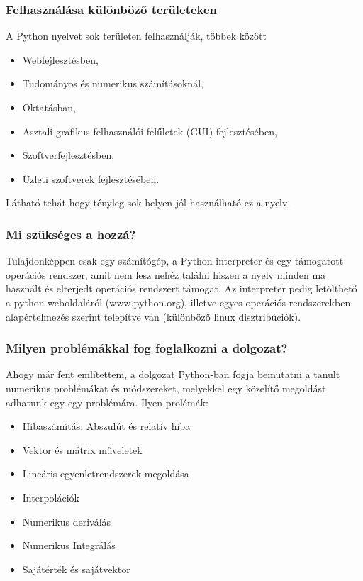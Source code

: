     \subsubsection{Felhasználása különböző
területeken}\label{felhasznuxe1luxe1sa-kuxfcluxf6nbuxf6zux151-teruxfcleteken}

    A Python nyelvet sok területen felhasználják, többek között

\begin{itemize}
\item
  Webfejlesztésben,
\item
  Tudományos és numerikus számításoknál,
\item
  Oktatásban,
\item
  Asztali grafikus felhasználói felűletek (GUI) fejlesztésében,
\item
  Szoftverfejlesztésben,
\item
  Üzleti szoftverek fejlesztésében.
\end{itemize}

Látható tehát hogy tényleg sok helyen jól használható ez a nyelv.

    \subsubsection{Mi szükséges a
hozzá?}\label{mi-szuxfcksuxe9ges-a-hozzuxe1}

    Tulajdonképpen csak egy számítógép, a Python interpreter és egy
támogatott operációs rendszer, amit nem lesz nehéz találni hiszen a
nyelv minden ma használt és elterjedt operációs rendszert támogat. Az
interpreter pedig letölthető a python weboldaláról (www.python.org),
illetve egyes operációs rendszerekben alapértelmezés szerint telepítve
van (különböző linux disztribúciók).

    \subsubsection{Milyen problémákkal fog foglalkozni a
dolgozat?}\label{milyen-probluxe9muxe1kkal-fog-foglalkozni-a-dolgozat}

    Ahogy már fent említettem, a dolgozat Python-ban fogja bemutatni a
tanult numerikus problémákat és módszereket, melyekkel egy közelítő
megoldást adhatunk egy-egy problémára. Ilyen prolémák:

\begin{itemize}
\item
  Hibaszámítás: Abszulút és relatív hiba
\item
  Vektor és mátrix műveletek
\item
  Lineáris egyenletrendszerek megoldása
\item
  Interpolációk
\item
  Numerikus deriválás
\item
  Numerikus Integrálás
\item
  Sajátérték és sajátvektor
\end{itemize}

